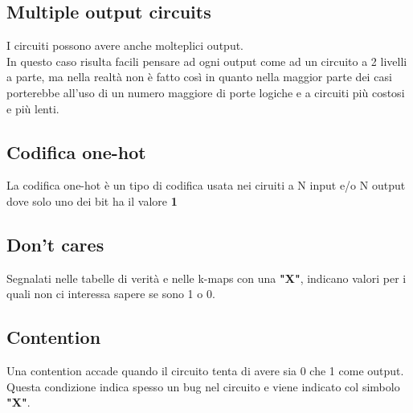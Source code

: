\documentclass{report}
\begin{document}
    \subsection{Multiple output circuits}
        I circuiti possono avere anche molteplici output. \\
        In questo caso risulta facili pensare ad ogni output come ad un circuito a 2
        livelli a parte, ma nella realtà non è fatto così in quanto nella maggior parte 
        dei casi porterebbe all'uso di un numero maggiore di porte logiche e a circuiti
        più costosi e più lenti.
    \subsection{Codifica one-hot}
        La codifica one-hot è un tipo di codifica usata nei ciruiti a N input e/o 
        N output dove solo uno dei bit ha il valore \textbf{1}
    \subsection{Don't cares}
        Segnalati nelle tabelle di verità e nelle k-maps con una \textbf{"X"}, indicano
        valori per i quali non ci interessa sapere se sono 1 o 0.
    \subsection{Contention}
        Una contention accade quando il circuito tenta di avere sia 0 che 1 come output. \\
        Questa condizione indica spesso un bug nel circuito e viene indicato col simbolo \textbf{"X"}.
\end{document}
